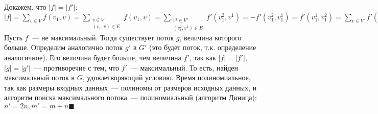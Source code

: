 \documentclass[a4paper]{article}
\begin{document}
\begin{enumerate}
Докажем, что $|f|=|f'|$:\newline
$|f|={\sum\limits_{v\in V}f(v_1,v)}={\sum\limits_{\substack{v\in V\\(v_1,v)\in E}}f(v_1,v)}=
{\sum\limits_{\substack{v^1\in V'\\(v^2_1,v^1)\in E}}f'(v^2_1,v^1)}=-f'(v^2_1,v^1_1)=f'(v^1_1,v^2_1)={\sum\limits_{v\in V'}f'(v^1_1,v)}=|f'|$\newline
Пусть $f$~--- не максимальный. Тогда существует поток $g$, величина которого больше. Определим аналогично поток $g'$ в $G'$ (это будет поток, т.к. определение аналогичное). Его величина будет больше, чем величина $f'$, так как $|f|=|f'|$, $|g|=|g'|$~--- противоречие с тем, что $f'$~--- максимальный.\newline
То есть, найден максимальный поток в $G$, удовлетворяющий условию.\newline
Время полиномиальное, так как размеры входных данных~--- полиномы от размеров исходных данных, и алгоритм поиска максимального потока~--- полиномиальный (алгоритм Диница):
$n'=2n,m'=m+n$$\blacksquare$
\end{enumerate}
\end{document}
